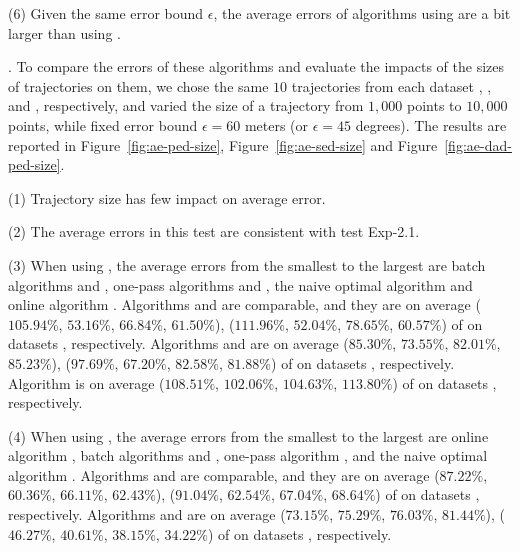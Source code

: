 
\sstab (6) Given the same error bound $\epsilon$, the average errors of algorithms using \sed are a bit larger than using \ped.



.
To compare the errors of these algorithms and evaluate the impacts of the sizes of trajectories on them, we chose the same $10$ trajectories from each dataset \taxi, \ucar, \geolife and \mopsi, respectively,
and varied the size  of a trajectory from $1,000$ points to $10,000$ points, while fixed error bound $\epsilon = 60$ meters ({or $\epsilon = 45$ degrees}).
The results are reported in Figure~\ref{fig:ae-ped-size}, Figure~\ref{fig:ae-sed-size} and Figure~\ref{fig:ae-dad-ped-size}.

\sstab (1) Trajectory size has few impact on average error.

\sstab (2) The average errors in this test are consistent with test Exp-2.1.

\sstab (3) {When using \ped,} the average errors from the smallest
to the largest are  batch algorithms \tpa and \dpa,
one-pass algorithms \siped and \operb, the naive optimal algorithm \opt and online algorithm \bqsa.
Algorithms \tpa and \dpa are comparable, and they are on average
{($105.94\%$, $53.16\%$, $66.84\%$, $61.50\%$), ($111.96\%$, $52.04\%$, $78.65\%$, $60.57\%$)} of \opt on datasets \dSets, respectively.
Algorithms \siped and \operb are on average {($85.30\%$, $73.55\%$, $82.01\%$,
  $85.23\%$), ($97.69\%$, $67.20\%$, $82.58\%$, $81.88\%$)}
of \opt on datasets \dSets, respectively.
Algorithm \bqsa is  on average  {($108.51\%$, $102.06\%$, $104.63\%$, $113.80\%$)}
of \opt on datasets \dSets, respectively.




\sstab (4) When using \sed, the average errors from the smallest
to the largest are online algorithm \squishe, batch algorithms \tpa and \dpa,
one-pass algorithm \cised, and the naive optimal algorithm \opt.
Algorithms \tpa and \dpa are comparable, and they are on average
{($87.22\%$, $60.36\%$, $66.11\%$, $62.43\%$), ($91.04\%$, $62.54\%$, $67.04\%$, $68.64\%$)} of \opt on datasets \dSets, respectively.
Algorithms \cised and \squishe are on average {($73.15\%$, $75.29\%$, $76.03\%$, $81.44\%$), ($46.27\%$, $40.61\%$, $38.15\%$, $34.22\%$)} of \opt on datasets \dSets, respectively.



